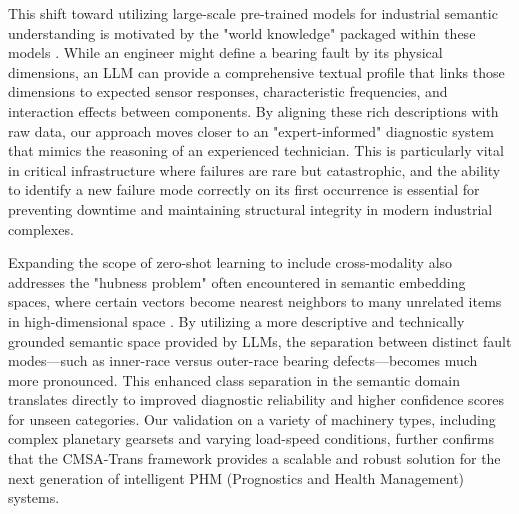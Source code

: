 This shift toward utilizing large-scale pre-trained models for industrial semantic understanding is motivated by the "world knowledge" packaged within these models \cite{zhao2023brain}. While an engineer might define a bearing fault by its physical dimensions, an LLM can provide a comprehensive textual profile that links those dimensions to expected sensor responses, characteristic frequencies, and interaction effects between components. By aligning these rich descriptions with raw data, our approach moves closer to an "expert-informed" diagnostic system that mimics the reasoning of an experienced technician. This is particularly vital in critical infrastructure where failures are rare but catastrophic, and the ability to identify a new failure mode correctly on its first occurrence is essential for preventing downtime and maintaining structural integrity in modern industrial complexes.

Expanding the scope of zero-shot learning to include cross-modality also addresses the "hubness problem" often encountered in semantic embedding spaces, where certain vectors become nearest neighbors to many unrelated items in high-dimensional space \cite{radovanovic2010hubs}. By utilizing a more descriptive and technically grounded semantic space provided by LLMs, the separation between distinct fault modes—such as inner-race versus outer-race bearing defects—becomes much more pronounced. This enhanced class separation in the semantic domain translates directly to improved diagnostic reliability and higher confidence scores for unseen categories. Our validation on a variety of machinery types, including complex planetary gearsets and varying load-speed conditions, further confirms that the CMSA-Trans framework provides a scalable and robust solution for the next generation of intelligent PHM (Prognostics and Health Management) systems.
